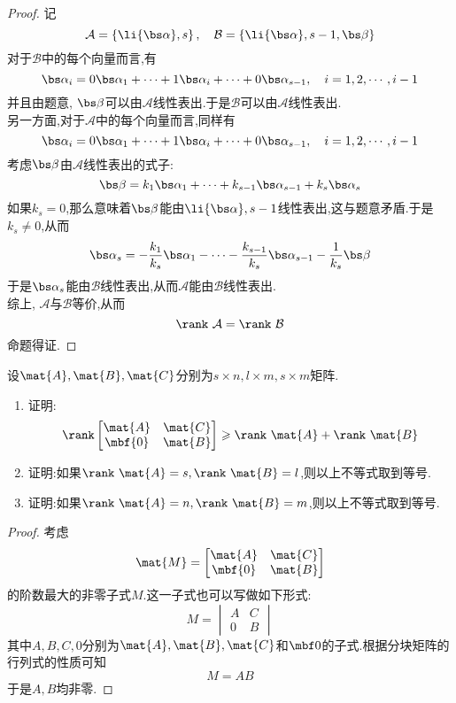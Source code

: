 \documentclass{ctexart}
\begin{document}
\begin{proof}
    记
    \[\mathcal{A}=\left\{\li{\bs\alpha},s\right\},\quad\mathcal{B}=\left\{\li{\bs\alpha},{s-1},\bs\beta\right\}\]
    对于$\mathcal{B}$中的每个向量而言,有
    \[\bs\alpha_{i}=0\bs\alpha_1+\cdots+1\bs\alpha_i+\cdots+0\bs\alpha_{s-1},\quad i=1,2,\cdots,i-1\]
    并且由题意, $\bs\beta$可以由$\mathcal{A}$线性表出.于是$\mathcal{B}$可以由$\mathcal{A}$线性表出.\\
    \indent 另一方面,对于$\mathcal{A}$中的每个向量而言,同样有
    \[\bs\alpha_{i}=0\bs\alpha_1+\cdots+1\bs\alpha_i+\cdots+0\bs\alpha_{s-1},\quad i=1,2,\cdots,i-1\]
    考虑$\bs\beta$由$\mathcal{A}$线性表出的式子:
    \[\bs\beta=k_1\bs\alpha_1+\cdots+k_{s-1}\bs\alpha_{s-1}+k_s\bs\alpha_s\]
    如果$k_s=0$,那么意味着$\bs\beta$能由$\li{\bs\alpha},{s-1}$线性表出,这与题意矛盾.于是$k_s\neq0$,从而
    \[\bs\alpha_s=-\dfrac{k_1}{k_s}\bs\alpha_1-\cdots-\dfrac{k_{s-1}}{k_s}\bs\alpha_{s-1}-\dfrac{1}{k_s}\bs\beta\]
    于是$\bs\alpha_s$能由$\mathcal{B}$线性表出,从而$\mathcal{A}$能由$\mathcal{B}$线性表出.\\
    \indent 综上, $\mathcal{A}$与$\mathcal{B}$等价,从而
    \[\rank\ \mathcal{A}=\rank\ \mathcal{B}\]
    命题得证.
\end{proof}
\begin{problem}
    设$\mat{A},\mat{B},\mat{C}$分别为$s\times n,l\times m,s\times m$矩阵.
    \begin{enumerate}[label=\tbf{\arabic*}.,topsep=0pt,parsep=0pt,itemsep=0pt,partopsep=0pt]
        \item 证明:
            \[\rank\begin{bmatrix}
                \mat{A}&\mat{C}\\
                \mbf{0}&\mat{B}
            \end{bmatrix}\geqslant\rank\ \mat{A}+\rank\ \mat{B}\]
        \item 证明:如果$\rank\ \mat{A}=s,\rank\ \mat{B}=l$,则以上不等式取到等号.
        \item 证明:如果$\rank\ \mat{A}=n,\rank\ \mat{B}=m$,则以上不等式取到等号.
    \end{enumerate}
\end{problem}
\begin{proof}
    考虑
    \[\mat{M}
    =\begin{bmatrix}
        \mat{A}&\mat{C}\\
        \mbf{0}&\mat{B}
    \end{bmatrix}\]
    的阶数最大的非零子式$M$.这一子式也可以写做如下形式:
    \[M=\begin{vmatrix}
        A&C\\0&B
    \end{vmatrix}\]
    其中$A,B,C,0$分别为$\mat{A},\mat{B},\mat{C}$和$\mbf0$的子式.根据分块矩阵的行列式的性质可知
    \[M=AB\]
    于是$A,B$均非零.
\end{proof}
\end{document}
